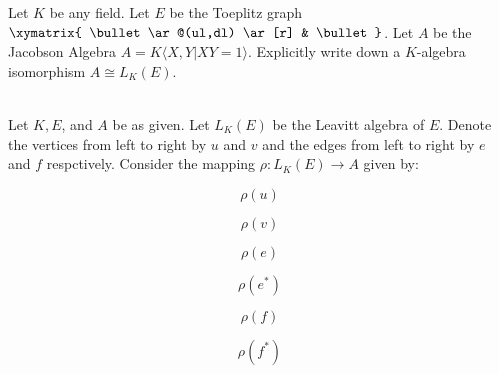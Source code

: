 Let $K$ be any field. Let $E$ be the Toeplitz graph  \ \ \
$\xymatrix{ \bullet \ar@(ul,dl)  \ar[r] & \bullet}$. Let $A$ be the Jacobson Algebra $A=K\langle X,Y|XY=1\rangle$.
Explicitly write down a $K$-algebra isomorphism $A\cong L_K(E)$.\\

\begin{solution}\renewcommand{\qedsymbol}{}\ \\
    Let $K, E$, and $A$ be as given. Let $L_K(E)$ be the Leavitt algebra of $E$. Denote the vertices from
    left to right by $u$ and $v$ and the edges from left to right by $e$ and $f$ respctively. Consider the
    mapping $\rho:L_K(E)\to A$ given by:

    $$\rho(u)$$

    $$\rho(v)$$

    $$\rho(e)$$

    $$\rho(e^*)$$

    $$\rho(f)$$

    $$\rho(f^*)$$

\end{solution}